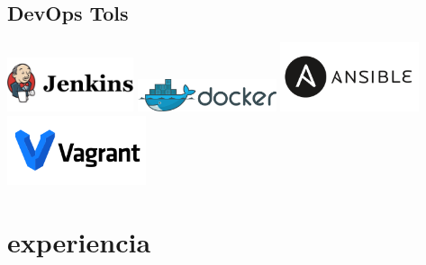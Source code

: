 \documentclass[]{cv-style}          %
\begin{document}
\begin{aside}
\section{DevOps Tols}
\includegraphics[width=10em]{devops/jenkins.png}\smallskip
\includegraphics[width=11em]{devops/docker.png}\smallskip
\includegraphics[width=11em]{devops/ansibl.png}\smallskip
\includegraphics[width=11em]{devops/vagrant.png}
\end{aside}





\section{experiencia}
\end{document}
